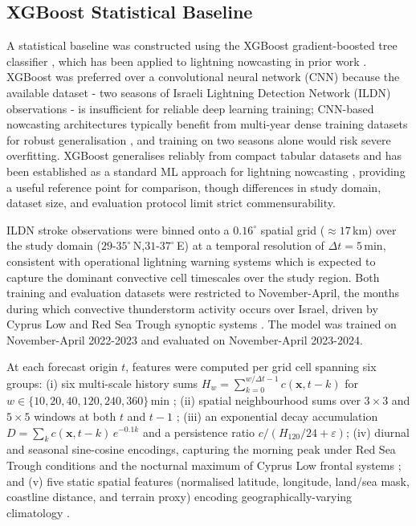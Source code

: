 \subsection{XGBoost Statistical Baseline}
\label{sec:xgboost_baseline}

A statistical baseline was constructed using the XGBoost gradient-boosted
tree classifier \citep{chen2016xgboost}, which has been applied to lightning
nowcasting in prior work \citep{mostajabi2019nowcasting,holzmann2018error}.
XGBoost was preferred over a convolutional neural network (CNN) because the
available dataset - two seasons of Israeli Lightning Detection Network (ILDN)
observations - is insufficient for reliable deep learning training; CNN-based
nowcasting architectures typically benefit from multi-year dense training
datasets for robust generalisation \citep{leinonen2022seamless}, and
training on two seasons alone would risk severe overfitting.
XGBoost generalises reliably from compact tabular datasets and has been
established as a standard ML approach for lightning nowcasting
\citep{mostajabi2019nowcasting}, providing a useful reference point for
comparison, though differences in study domain, dataset size, and evaluation
protocol limit strict commensurability.

ILDN stroke observations were binned onto a $0.16^{\circ}$ spatial grid
(${\approx}17$\,km) over the study domain
($29$-$35^{\circ}$\,N,\;$31$-$37^{\circ}$\,E) at a temporal resolution
of $\Delta t = 5$\,min, consistent with operational lightning warning systems
\citep{leinonen2022seamless,holzmann2018error} which is expected to capture the dominant convective cell
timescales over the study region.
Both training and evaluation datasets were restricted to November-April,
the months during which convective thunderstorm activity occurs over Israel,
driven by Cyprus Low and Red Sea Trough synoptic systems
\citep{altaratz2003lightning,benami2015lightning}.
The model was trained on November-April 2022-2023 and evaluated on
November-April 2023-2024.

At each forecast origin $t$, features were computed per grid cell spanning
six groups: (i) six multi-scale history sums
$H_w = \sum_{k=0}^{w/\Delta t-1} c(\mathbf{x},t{-}k)$ for
$w \in \{10,20,40,120,240,360\}$\,min \citep{foresti2019using};
(ii) spatial neighbourhood sums over $3{\times}3$ and $5{\times}5$ windows
at both $t$ and $t{-}1$ \citep{holzmann2018error};
(iii) an exponential decay accumulation
$D = \sum_k c(\mathbf{x},t{-}k)\,e^{-0.1k}$ and a persistence ratio
$c / (H_{120}/24 + \varepsilon)$;
(iv) diurnal and seasonal sine-cosine encodings, capturing the morning peak
under Red Sea Trough conditions and the nocturnal maximum of Cyprus Low
frontal systems \citep{benami2015lightning,altaratz2003lightning};
and (v) five static spatial features (normalised latitude, longitude,
land/sea mask, coastline distance, and terrain proxy) encoding
geographically-varying climatology \citep{altaratz2003lightning}.


